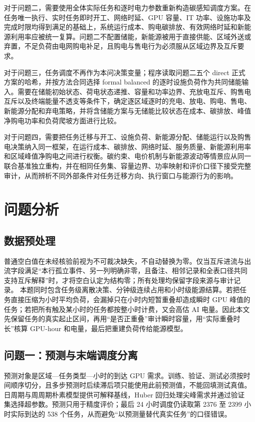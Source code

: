 \documentclass[withoutpreface,bwprint]{cumcmthesis}
\begin{document}
对于问题二，需要使用全体实际任务和逐时电力参数重新构造碳感知调度方案。在任务唯一执行、实时任务即时开工、网络时延、GPU 容量、IT 功率、设施功率及完成时限均得到满足的基础上，系统运行成本、购电碳排放、有效网络时延和新能源利用率应被统一复算。问题二不配置储能，新能源被用于直接供能、区域外送或弃置，不足负荷由电网购电补足，且购电与售电行为必须服从区域边界及互斥要求。

对于问题三，任务调度不再作为本问决策变量；程序读取问题二五个 direct 正式方案的哈希，并按方法合同选择 formal balanced 的逐时设施负荷作为共同储能输入。需要在储能初始状态、荷电状态递推、容量和功率边界、充放电互斥、购售电互斥以及终端能量不透支等条件下，确定逐区域逐时的充电、放电、购电、售电、新能源分配和弃电策略，并将含储能方案与无储能比较状态在成本、碳排放、峰值净购电功率和负荷爬坡方面进行比较。

对于问题四，需要把任务迁移与开工、设施负荷、新能源分配、储能运行以及购售电决策纳入同一框架，在运行成本、碳排放、网络时延、服务质量、新能源利用率和区域峰值净购电之间进行权衡。碳约束、电价机制与新能源波动等情景应从同一联合基准独立重构，并在相同任务集、容量边界、功率映射和评价口径下接受完整审计，从而辨析不同外部条件对任务迁移方向、执行窗口与能源行为的影响。
\section{问题分析}

\subsection{数据预处理}
普通空白值在未经核验前视为不可裁决缺失，不自动替换为零。仅当互斥进流与出流字段满足“本行孤立事件、另一列明确非零，且备注、相邻记录和全表口径共同支持互斥解释”时，才将空白认定为结构零；所有处理均保留字段来源与审计记录。
本题同时包含任务级离散决策、分钟级连续占用和小时级能源结算。若把任务直接压缩为小时平均负荷，会漏掉只在小时内短暂重叠却造成瞬时 GPU 峰值的任务；若把所有触及某小时的任务都按整小时计费，又会高估 AI 电量。因此本文先保留任务的真实起止区间，再用“是否正重叠”审计瞬时容量，用“实际重叠时长”核算 GPU-hour 和电量，最后把重建负荷传给能源模型。

\subsection{问题一：预测与末端调度分离}
预测对象是区域—任务类型—小时的到达 GPU 需求。训练、验证、测试必须按时间顺序切分，且多步预测时后续滞后项只能使用此前预测值，不能回填测试真值。日周期与周周期朴素模型提供可解释基线，Huber 回归处理尖峰需求并通过验证集选择超参数\cite{huber1964robust}。预测只用于精度评价；最后 24 小时调度仍读取第 2376 至 2399 小时实际到达的 538 个任务，从而避免“以预测量替代真实任务”的口径错误。
\end{document}
